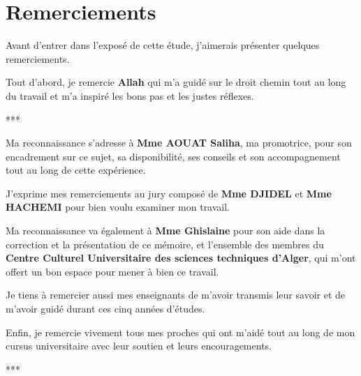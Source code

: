 \begin{titlepage}
\itshape

\chapter*{Remerciements}

Avant d'entrer dans l'exposé de cette étude, j'aimerais présenter quelques remerciements.

Tout d'abord, je remercie \textbf{Allah} qui m'a guidé sur le droit chemin tout
au long du travail et m'a inspiré les bons pas et les justes réflexes.
\begin{center}
***
\end{center}
Ma reconnaissance s'adresse à \textbf{Mme AOUAT Saliha}, ma promotrice,
pour son encadrement sur ce sujet, sa disponibilité, ses conseils et son accompagnement
tout au long de cette expérience.

J'exprime mes remerciements au jury composé de \textbf{Mme DJIDEL} et \textbf{Mme HACHEMI}
pour bien voulu examiner mon travail.

Ma reconnaissance va également à \textbf{Mme Ghislaine} pour son aide dans
la correction et la présentation de ce mémoire, et l'ensemble des membres du
\textbf{Centre Culturel Universitaire des sciences techniques d'Alger}, qui
m'ont offert un bon espace pour mener à bien ce travail.

Je tiens à remercier aussi mes enseignants de m'avoir transmis leur savoir et
de m'avoir guidé durant ces cinq années d'études.

Enfin, je remercie vivement tous mes proches qui ont m'aidé tout au long de mon
cursus universitaire avec leur soutien et leurs encouragements.
\begin{center}
***
\end{center}
\end{titlepage}
